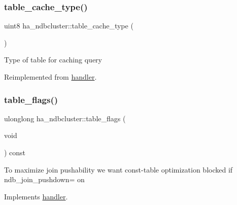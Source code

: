 \mbox{\label{classha__ndbcluster_ac3a23eb89230938663a59fcf8fbe908b}} 
\subsubsection{\texorpdfstring{table\+\_\+cache\+\_\+type()}{table\_cache\_type()}}
{\footnotesize\ttfamily uint8 ha\+\_\+ndbcluster\+::table\+\_\+cache\+\_\+type (\begin{DoxyParamCaption}{ }\end{DoxyParamCaption})\hspace{0.3cm}{\ttfamily [virtual]}}

Type of table for caching query 

Reimplemented from \mbox{\hyperlink{classhandler_ab4d7cf309121ec10e4150860c8caa12a}{handler}}.

\mbox{\label{classha__ndbcluster_a99dc30c67efa4a7d6d6f3ded9a67b40b}} 
\subsubsection{\texorpdfstring{table\+\_\+flags()}{table\_flags()}}
{\footnotesize\ttfamily ulonglong ha\+\_\+ndbcluster\+::table\+\_\+flags (\begin{DoxyParamCaption}\item[{void}]{ }\end{DoxyParamCaption}) const\hspace{0.3cm}{\ttfamily [virtual]}}

To maximize join pushability we want const-\/table optimization blocked if \textquotesingle{}ndb\+\_\+join\+\_\+pushdown= on\textquotesingle{}

Implements \mbox{\hyperlink{classhandler}{handler}}.

\mbox{\label{classha__ndbcluster_a96d160419836ac20e131570a32e1c4a8}} 
